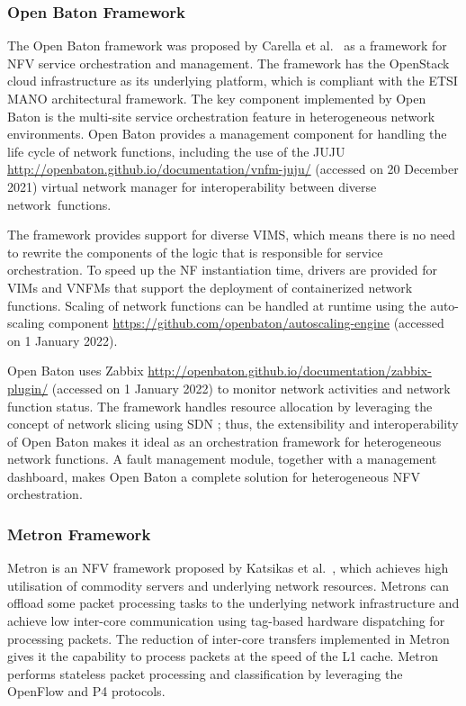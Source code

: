 \documentclass[futureinternet,review,accept,pdftex,moreauthors]{Definitions/mdpi}
\begin{document}
\subsubsection{Open Baton Framework}
\label{OpenBaton}
The Open Baton framework was proposed by Carella {et al.}~\cite{carella2015open} as a framework for NFV service orchestration and management. The framework has the OpenStack cloud infrastructure as its underlying platform, which is compliant with the ETSI MANO architectural framework. The key component implemented by Open Baton is the multi-site service orchestration feature in heterogeneous network environments. Open Baton provides a management component for handling the life cycle of network functions, including the use of the JUJU {\url{http://openbaton.github.io/documentation/vnfm-juju/}} ({accessed} %
on 20 December 2021) virtual network manager for interoperability between diverse network~functions. 

The framework provides support for diverse VIMS, which means there is no need to rewrite the components of the logic that is responsible for service orchestration. To speed up the NF instantiation time, drivers are provided for VIMs and VNFMs that support the deployment of containerized network functions. Scaling of network functions can be handled at runtime using the auto-scaling {component} {\url{https://github.com/openbaton/autoscaling-engine}} ({accessed} %
on 1 January 2022). 

Open Baton  uses {Zabbix} {\url{http://openbaton.github.io/documentation/zabbix-plugin/}} ({accessed} %
on 1 January 2022)  to monitor network activities and network function status. The framework handles resource allocation by leveraging the concept of network slicing using SDN ; thus, the extensibility and interoperability of Open Baton makes it ideal as an orchestration framework for heterogeneous network functions. A fault management module, together with a management dashboard, makes Open Baton a complete solution for heterogeneous NFV orchestration.


\subsubsection{Metron Framework}
\label{Metron}
Metron is an NFV framework proposed by Katsikas {et al.}~\cite{katsikas2018metron}, which achieves high utilisation of commodity servers and underlying network resources. Metrons can offload some packet processing tasks to the underlying network infrastructure and achieve low inter-core communication using tag-based hardware dispatching for processing packets. The reduction of inter-core transfers implemented in Metron gives it the capability to process packets at the speed of the L1 cache. Metron performs stateless packet processing and classification by leveraging the OpenFlow and P4 protocols. 
\end{document}
